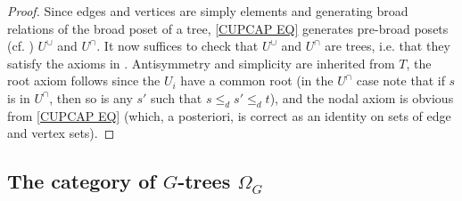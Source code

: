 \documentclass[a4paper,10pt
,draft
]{article}%
\begin{document}
\begin{proof}
	Since edges and vertices are simply elements and generating broad relations of the broad poset of a tree,  
	\eqref{CUPCAP EQ} generates pre-broad posets 
	(cf. \cite[Rem. 5.2]{Per18}) $U^{\cup}$ and $U^{\cap}$.
	It now suffices to check that 
	$U^{\cup}$ and $U^{\cap}$ are trees,
	i.e. that they satisfy the axioms in 
	\cite[Defs. 5.1, 5.3, 5.9]{Per18}.
	Antisymmetry and simplicity are inherited from $T$, the root axiom follows since the $U_i$ have a common root (in the $U^{\cap}$ case note that if $s$ is in $U^{\cap}$, then so is any $s'$ such that
	$s \leq_d s' \leq_d t$),
	and the nodal axiom is obvious from \eqref{CUPCAP EQ} (which, a posteriori, is correct as an identity on sets of edge and vertex sets).
\end{proof}


\subsection{The category of $G$-trees $\Omega_G$}
\end{document}
